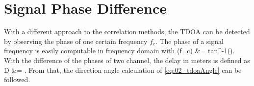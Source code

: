 \section{Signal Phase Difference}
\label{sec:02_phase}

With a different approach to the correlation methods, the \ac{TDOA} can be
detected by observing the phase of one certain frequency $f_c$.
The phase of a signal frequency is easily computable in frequency domain
with
\bal
    \phi(f_c) &= tan^{-1}().
\eal
With the difference of the phases of two channel, the delay in meters is defined as
\bal
    D &= .
\eal
From that, the direction angle calculation of \cref{eq:02_tdoaAngle} can
be followed.